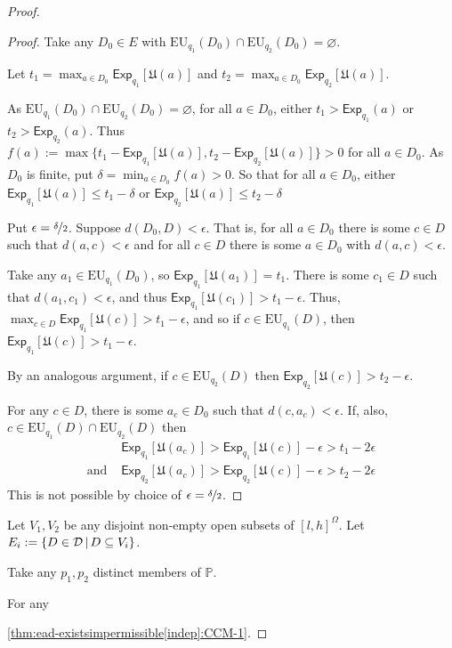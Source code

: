 \documentclass[a4paper]{article}
\newcommand\A{\mathcal{A}}
\renewcommand\P{\mathbb{P}} %
\newcommand\Exp{\mathsf{Exp}}
\newcommand\EU{\mathrm{EU}}
\newcommand\U{\mathfrak{U}} %
\newcommand{\D}{\mathcal{D}}
\newcommand{\Decs}{\mathcal{D}}
\newcommand{\IP}{\P}
\newcommand\SetDelimiter[1][]{
	\nonscript\,#1\vert \allowbreak \nonscript\,\mathopen{}}
\providecommand\given{\SetDelimiter}
\renewcommand{\emptyset}{\varnothing}
\renewcommand{\leq}{\leqslant}
\newenvironment{CCM rewritten}
{\begingroup\color{blue}} %
{\endgroup}              %
\begin{document}
\begin{proof}
\begin{proof}
		Take any $D_0\in E$ with $\EU_{q_1}(D_0)\cap \EU_{q_2}(D_0)=\emptyset$. 
		
				Let $t_1=\max_{a\in D_0}\Exp_{q_1}[\U(a)]$ and $t_2=\max_{a\in D_0}\Exp_{q_2}[\U(a)]$.
				
				As  $\EU_{q_1}(D_0)\cap \EU_{q_2}(D_0)=\emptyset$, for all $a\in D_0$, either $t_1>\Exp_{q_1}(a)$ or  $t_2>\Exp_{q_2}(a)$. Thus $f(a):=\max\{t_1-\Exp_{q_1}[\U(a)],t_2-\Exp_{q_2}[\U(a)]\}>0$ for all $a\in D_0$. As $D_0$ is finite, put $\delta=\min_{a\in D_0}f(a)>0$. So that for all $a\in D_0$, either  $\Exp_{q_1}[\U(a)]\leq t_1-\delta$ or $\Exp_{q_2}[\U(a)]\leq t_2-\delta$
		
		Put $\epsilon=\nicefrac{\delta}{2}$. Suppose $d(D_0,D)<\epsilon$. That is, for all $a\in D_0$ there is some $c\in D$ such that $d(a,c)<\epsilon$ and for all $c\in D$ there is some $a\in D_0$ with $d(a,c)<\epsilon$. 
		
		Take any $a_1\in \EU_{q_1}(D_0)$, so $\Exp_{q_1}[\U(a_1)]=t_1$. There is some $c_1\in D$ such that $d(a_1,c_1)<\epsilon$, and thus $\Exp_{q_1}[\U(c_1)]>t_1-\epsilon$. Thus, $\max_{c\in D}\Exp_{q_1}[\U(c)]>t_1-\epsilon$, and so if $c\in \EU_{q_1}(D)$, then $\Exp_{q_1}[\U(c)]>t_1-\epsilon$. 
		
		
		By an analogous argument, if $c\in \EU_{q_2}(D)$ then $\Exp_{q_2}[\U(c)]>t_2-\epsilon$. 
		
		For any $c\in D$, there is some $a_c\in D_0$ such that $d(c,a_c)<\epsilon$. If, also,  $c\in \EU_{q_1}(D)\cap\EU_{q_2}(D)$ then 
		\begin{align}
			&\Exp_{q_1}[\U(a_c)]>\Exp_{q_1}[\U(c)]-\epsilon>t_1-2\epsilon\\
			\text{and }&\Exp_{q_2}[\U(a_c)]>\Exp_{q_2}[\U(c)]-\epsilon>t_2-2\epsilon
		\end{align}
		This is not possible by choice of $\epsilon=\nicefrac{\delta}{2}$. 		
%	
%	
%	
%		
%		
%		
%		
%		
		 \end{proof}
		 
		 	Let $V_1,V_2$ be any disjoint non-empty open subsets of $[l,h]^\Omega$. Let $E_i:=\{D\in\D\given D\subseteq V_i\}$. 
		 	
	Take any $p_1,p_2$ distinct members of $\IP$. 
	
	For any 
	
	 \cref{thm:ead-existsimpermissible[indep]:CCM-1}.	
\end{proof}
\end{document}
